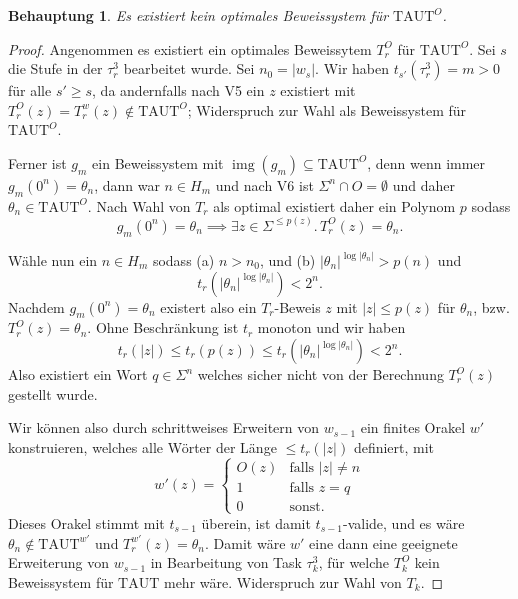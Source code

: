 \documentclass[nofonts]{uebung}
\newtheorem{claim}[theorem]{Behauptung}
\def\TAUT{\ensuremath{\mathrm{TAUT}}}
\DeclareMathOperator{\img}{img}
\begin{document}
\begin{claim}
    Es existiert kein optimales Beweissystem für $\TAUT^O$.
\end{claim}
\begin{proof}
    Angenommen es existiert ein optimales Beweissytem $T_r^O$ für $\TAUT^O$.
    Sei $s$ die Stufe in der $\tau^3_{r}$ bearbeitet wurde. Sei $n_0=|w_s|$.
    Wir haben $t_{s'}(\tau^3_{r})=m>0$ für alle $s'\geq s$, da andernfalls nach V5 ein $z$ existiert mit $T_r^O(z)=T_r^w(z)\not\in\TAUT^O$; Widerspruch zur Wahl als Beweissystem für $\TAUT^O$.

    Ferner ist $g_m$ ein Beweissystem mit $\img(g_m)\subseteq \TAUT^O$, denn wenn immer $g_m(0^n)=\theta_n$, dann war $n\in H_m$ und nach V6 ist $\Sigma^n\cap O=\emptyset$ und daher $\theta_n\in\TAUT^O$.
    Nach Wahl von $T_r$ als optimal existiert daher ein Polynom $p$ sodass 
    \[ g_m(0^n)=\theta_n \implies \exists z\in\Sigma^{\leq p(z)}.\, T_r^O(z)=\theta_n. \]

    Wähle nun ein $n\in H_m$ sodass (a) $n>n_0$, und (b) $|\theta_n|^{\log |\theta_n|}>p(n)$ und
    \[ t_r(|\theta_n|^{\log|\theta_n|}) < 2^n \tag{c}. \] 
    Nachdem $g_m(0^n)=\theta_n$ existert also ein $T_r$-Beweis $z$ mit $|z|\leq p(z)$ für $\theta_n$, bzw. $T_r^O(z)=\theta_n$.
    Ohne Beschränkung ist $t_r$ monoton und wir haben
    \[ t_r(|z|)\leq t_r(p(z)) \leq  t_r(|\theta_n|^{\log|\theta_n|}) < 2^n. \]
    Also existiert ein Wort $q\in\Sigma^n$ welches sicher nicht von der Berechnung $T^O_r(z)$ gestellt wurde.

    Wir können also durch schrittweises Erweitern von $w_{s-1}$ ein finites Orakel $w'$ konstruieren, welches alle Wörter der Länge $\leq t_r(|z|)$ definiert, mit
    \[ w'(z)=\begin{cases} O(z) & \text{falls $|z|\neq n$} \\ 1 & \text{falls $z=q$} \\ 0 & \text{sonst}. \end{cases} \]
    Dieses Orakel stimmt mit $t_{s-1}$ überein, ist damit $t_{s-1}$-valide, und es wäre $\theta_n\not\in\TAUT^{w'}$ und $T_r^{w'}(z)=\theta_n$.
    Damit wäre $w'$ eine dann eine geeignete Erweiterung von $w_{s-1}$ in Bearbeitung von Task $\tau^3_{k}$, für welche $T_k^O$ kein Beweissystem für $\TAUT$ mehr wäre. Widerspruch zur Wahl von $T_k$.
\end{proof}
\end{document}
